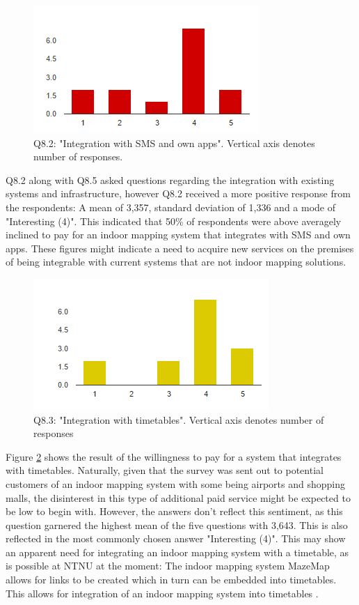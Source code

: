 \begin{figure}
\centering
\includegraphics{figs/q82.PNG}
\caption{Q8.2: "Integration with SMS and own apps". Vertical axis denotes number of responses.}
\label{fig:q82}
\end{figure}
Q8.2 along with Q8.5 asked questions regarding the integration with existing systems and infrastructure, however Q8.2 received a more positive response from the respondents: A mean of 3,357, standard deviation of 1,336 and a mode of "Interesting (4)". This indicated that 50\% of respondents were above averagely inclined to pay for an indoor mapping system that integrates with SMS and own apps. These figures might indicate a need to acquire new services on the premises of being integrable with current systems that are not indoor mapping solutions.  
\begin{figure}
\centering
\includegraphics{figs/q83.PNG}
\caption{Q8.3: "Integration with timetables". Vertical axis denotes number of responses}
\label{fig:q83}
\end{figure}
Figure \ref{fig:q83} shows the result of the willingness to pay for a system that integrates with timetables. Naturally, given that the survey was sent out to potential customers of an indoor mapping system with some being airports and shopping malls, the disinterest in this type of additional paid service might be expected to be low to begin with. However, the answers don't reflect this sentiment, as this question garnered the highest mean of the five questions with 3,643. This is also reflected in the most commonly chosen answer "Interesting (4)". This may show an apparent need for integrating an indoor mapping system with a timetable, as is possible at NTNU at the moment: The indoor mapping system MazeMap allows for links to be created which in turn can be embedded into timetables. This allows for integration of an indoor mapping system into timetables \cite{oracleservicentnu}.
